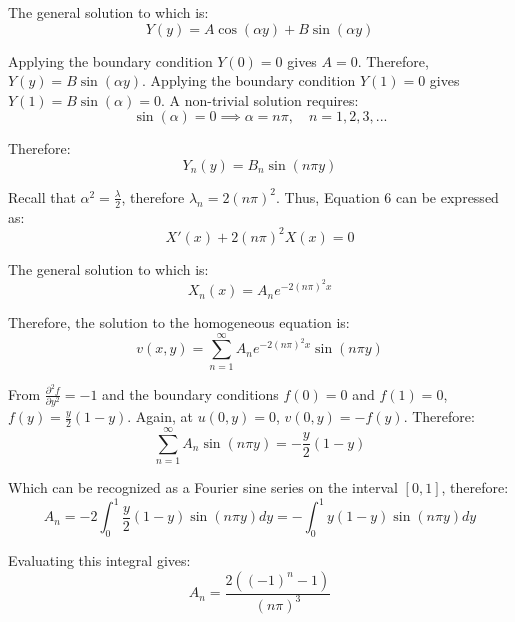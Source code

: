 \documentclass[letterpaper,12pt]{article}
\begin{document}
The general solution to which is:
\begin{equation}
Y(y) = A \cos(\alpha y) + B \sin(\alpha y) 
\end{equation}

Applying the boundary condition $Y(0) = 0$ gives $A = 0$. Therefore, $Y(y) = B \sin(\alpha y)$. Applying the boundary condition $Y(1) = 0$ gives $Y(1) = B \sin(\alpha) = 0$. A non-trivial solution requires:
\begin{equation}
\sin(\alpha) = 0 \implies \alpha = n \pi, \quad n = 1, 2, 3, ...
\end{equation}

Therefore:
\begin{equation}
Y_n(y) = B_n \sin(n \pi y)
\end{equation}


Recall that $\alpha^2 = \frac{\lambda}{2}$, therefore $\lambda_n = 2 (n \pi)^2$. Thus, Equation 6 can be expressed as:
\begin{equation}
X'(x) + 2 (n \pi)^2 X(x) = 0
\end{equation}

The general solution to which is:
\begin{equation}
X_n(x) = A_n e^{-2 (n \pi)^2 x}
\end{equation}

Therefore, the solution to the homogeneous equation is:
\begin{equation}
v(x,y) = \sum_{n=1}^{\infty} A_n e^{-2 (n \pi)^2 x} \sin(n \pi y)
\end{equation}

From $\frac{\partial^2 f}{\partial y^2} = -1 $ and the boundary conditions $f(0) = 0$ and $f(1) = 0$, $f(y) = \frac{y}{2} \left(1 - y\right)$. Again, at $u(0, y) = 0$, $v(0, y) = -f(y)$. Therefore:
\begin{equation}
\sum_{n=1}^{\infty} A_n \sin(n \pi y) = -\frac{y}{2} \left(1 - y\right)
\end{equation}

Which can be recognized as a Fourier sine series on the interval $[0, 1]$, therefore:
\begin{equation}
A_n = -2 \int_0^1 \frac{y}{2} (1-y) \sin(n \pi y) dy = - \int_0^1 y (1-y) \sin(n \pi y) dy
\end{equation}

Evaluating this integral gives:
\begin{equation}
A_n = \frac{2 \left((-1)^n - 1\right)}{\left(n \pi\right)^3}
\end{equation}
\end{document}
